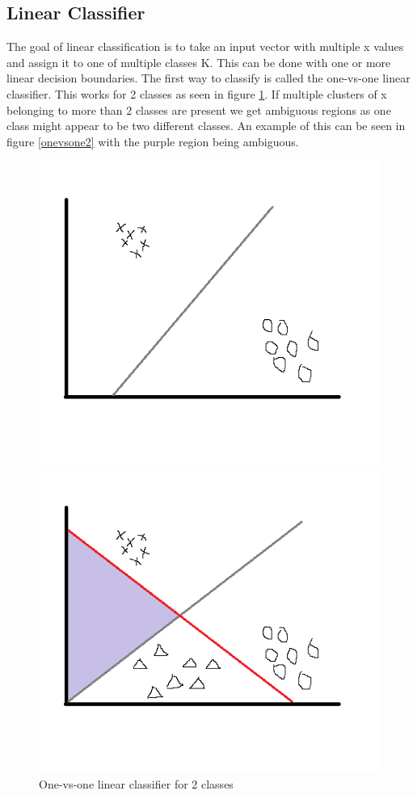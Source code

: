 \subsection{Linear Classifier}
The goal of linear classification is to take an input vector with multiple x values and assign it to one of multiple classes K. This can be done with one or more linear decision boundaries. The first way to classify is called the one-vs-one linear classifier. This works for 2 classes as seen in figure \ref{onevsone1}. If multiple clusters of x belonging to more than 2 classes are present we get ambiguous regions as one class might appear to be two different classes. An example of this can be seen in figure \ref{onevsone2} with the purple region being ambiguous.
\begin{figure}[H]
\centering
\begin{minipage}[b]{0.5\textwidth}
\centering
\includegraphics[scale=0.5]{billeder/onevsone1}
\caption{One-vs-one linear classifier for 2 classes}
\label{onevsone1}
\end{minipage}%
\begin{minipage}[b]{0.5\textwidth}
\centering
\includegraphics[scale=0.5]{billeder/onevsone2}

\end{minipage}
\end{figure}

